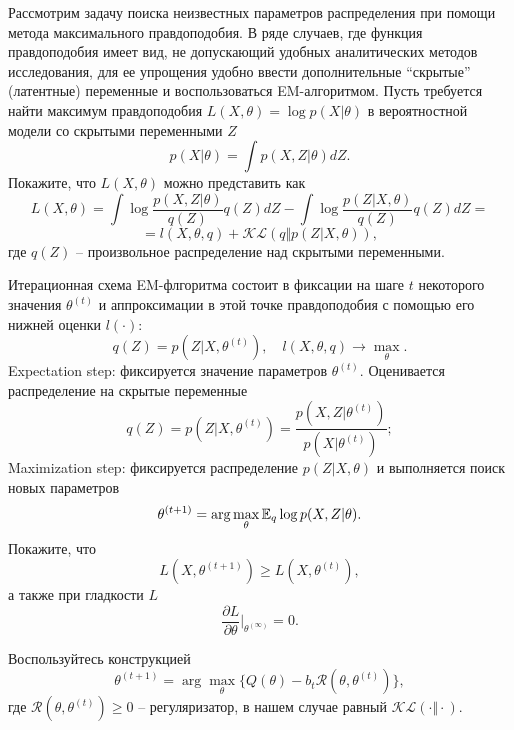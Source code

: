 \begin{problem}[EM-алгоритм]
\label{em}

Рассмотрим задачу поиска неизвестных параметров распределения при помощи метода максимального правдоподобия. В ряде случаев, где функция правдоподобия имеет вид, не допускающий удобных аналитических методов исследования, для ее упрощения удобно ввести дополнительные ``скрытые'' (латентные) переменные и воспользоваться EM-алгоритмом.
Пусть требуется найти максимум правдоподобия $L(X,\theta) = \log p(X | \theta)$ в вероятностной модели со скрытыми переменными $Z$
\[
p(X | \theta) = \int p(X, Z | \theta) dZ.
\]
Покажите, что $L(X,\theta)$ можно представить как
\[
L(X,\theta) = \int \log \frac{p(X, Z | \theta)}{q(Z)} q(Z) dZ - \int \log \frac{p(Z | X, \theta)}{q(Z)} q(Z) dZ = 
\]
\[
 = l(X, \theta, q) + \mathcal{KL}(q \Vert p(Z | X, \theta)),
\]
где $q(Z)$ -- произвольное распределение над скрытыми переменными.

Итерационная схема EM-флгоритма состоит в фиксации на шаге $t$ некоторого значения $\theta^{(t)}$ и аппроксимации в этой точке правдоподобия с помощью его нижней оценки $l(\cdot)$:
\[
q(Z) = p(Z | X, \theta^{(t)}), \quad l(X, \theta, q) \to \max_{\theta}.
\]
Expectation step: фиксируется значение параметров $\theta^{(t)}$. Оценивается распределение на скрытые переменные
\[
q(Z) = p(Z |X, \theta^{(t)}) = \frac{p(X, Z | \theta^{(t)})} {p(X|\theta^{(t)})};
\]
Maximization step: фиксируется распределение $p(Z|X, \theta)$ и выполняется поиск новых параметров
\[
\theta^{(t+1)} = \arg\max_{\theta} \mathrm{{\mathbb E}}_q \log p(X,Z|\theta).
\]
Покажите, что 
\[
L(X,\theta^{(t+1)}) \geq L(X,\theta^{(t)}),
\]
а также при гладкости $L$
\[
\frac{\partial L}{\partial \theta} \bigg|_{\theta^{(\infty)}} = 0.
\]
\end{problem}

\begin{ordre}
Воспользуйтесь конструкцией
\[
\theta^{(t+1)} = \arg \max \limits_{\theta} \{ Q(\theta)  - b_t \mathcal{R} (\theta, \theta^{(t)})\},
\]
где $\mathcal{R} (\theta, \theta^{(t)}) \geq 0$ -- регуляризатор, в нашем случае равный $\mathcal{KL}(\cdot\Vert\cdot) $.
\end{ordre}


